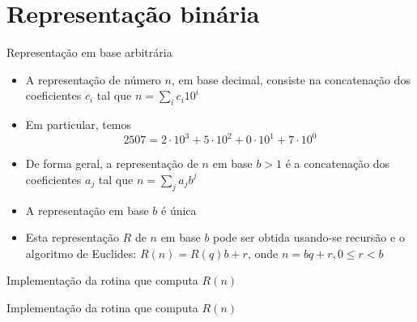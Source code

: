 \section{Representação binária}

\begin{frame}[fragile]{Representação em base arbitrária}

    \begin{itemize}
        \item A representação de número $n$, em base decimal, consiste na concatenação dos
            coeficientes $c_i$ tal que $n = \sum_i c_i10^i$

        \item Em particular, temos 
        \[
            2507 = 2\cdot 10^3 + 5\cdot 10^2 + 0\cdot 10^1 + 7\cdot 10^0 
        \]

        \item De forma geral, a representação de $n$ em base $b > 1$ é a concatenação dos 
        coeficientes $a_j$ tal que $n = \sum_j a_jb^j$

        \item A representação em base $b$ é única

        \item Esta representação $R$ de $n$ em base $b$ pode ser obtida usando-se recursão e o 
            algoritmo de Euclides: $R(n) = R(q)b + r$, onde $n = bq + r, 0 \leq r < b$
    \end{itemize}

\end{frame}

\begin{frame}[fragile]{Implementação da rotina que computa $R(n)$}
\end{frame}

\begin{frame}[fragile]{Implementação da rotina que computa $R(n)$}
\end{frame}

